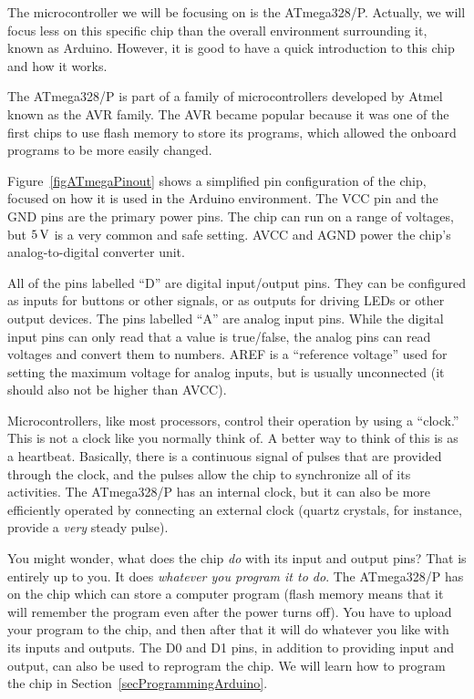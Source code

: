 The microcontroller we will be focusing on is the ATmega328/P.
Actually, we will focus less on this specific chip than the overall environment surrounding it, known as Arduino.
However, it is good to have a quick introduction to this chip and how it works.

The ATmega328/P is part of a family of microcontrollers developed by Atmel known as the AVR family.
The AVR became popular because it was one of the first chips to use flash memory to store its programs, which allowed the onboard programs to be more easily changed.

Figure~\ref{figATmegaPinout} shows a simplified pin configuration of the chip, focused on how it is used in the Arduino environment.
The VCC pin and the GND pins are the primary power pins.
The chip can run on a range of voltages, but $5\,\si{\volt}$ is a very common and safe setting.
AVCC and AGND power the chip's analog-to-digital converter unit.


All of the pins labelled ``D'' are digital input/output pins.
They can be configured as inputs for buttons or other signals, or as outputs for driving LEDs or other output devices.
The pins labelled ``A'' are analog input pins.
While the digital input pins can only read that a value is true/false, the analog pins can read voltages and convert them to numbers.
AREF is a ``reference voltage'' used for setting the maximum voltage for analog inputs, but is usually unconnected (it should also not be higher than AVCC).

Microcontrollers, like most processors, control their operation by using a ``clock.''  
This is not a clock like you normally think of.
A better way to think of this is as a heartbeat.
Basically, there is a continuous signal of pulses that are provided through the clock, and the pulses allow the chip to synchronize all of its activities.
The ATmega328/P has an internal clock, but it can also be more efficiently operated by connecting an external clock (quartz crystals, for instance, provide a \emph{very} steady pulse).

You might wonder, what does the chip \emph{do} with its input and output pins?
That is entirely up to you.  
It does \emph{whatever you program it to do}.
The ATmega328/P has  on the chip which can store a computer program (flash memory means that it will remember the program even after the power turns off).
You have to upload your program to the chip, and then after that it will do whatever you like with its inputs and outputs.
The D0 and D1 pins, in addition to providing input and output, can also be used to reprogram the chip.
We will learn how to program the chip in Section~\ref{secProgrammingArduino}.

